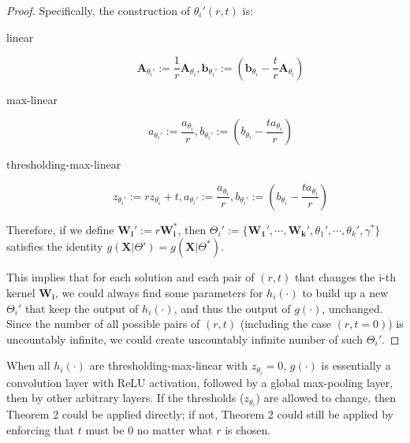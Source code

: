 \documentclass[12pt]{article}
\newcommand{\vect}[1]{\mathbf{#1}}
\newcommand{\matrixSymbol}[1]{\mathbf{#1}}
\begin{document}
\begin{proof}
Specifically, the construction of $\theta_i'(r, t)$ is:
\begin{description}
\item[linear] \begin{equation} \matrixSymbol{A}_{\theta_i'} := \frac{1}{r}\matrixSymbol{A}_{\theta_i}, \vect{b}_{\theta_i'} := (\vect{b}_{\theta_i} - \frac{t}{r}\matrixSymbol{A}_{\theta_i}) \end{equation}
\item[max-linear] \begin{equation} a_{\theta_i'} := \frac{a_{\theta_i}}{r}, b_{\theta_i'} := (b_{\theta_i} - \frac{ta_{\theta_i}}{r}) \end{equation}
\item[thresholding-max-linear] \begin{equation} z_{\theta_i'} := rz_{\theta_i}+t, a_{\theta_i'} := \frac{a_{\theta_i}}{r}, b_{\theta_i'} := (b_{\theta_i} - \frac{ta_{\theta_i}}{r}) \end{equation}
\end{description}

Therefore, if we define $\matrixSymbol{W_{i}'} := r\matrixSymbol{W_{i}^*}$, then $\Theta_i' := \{ \matrixSymbol{W_1'}, \cdots, \matrixSymbol{W_k'}, \theta_1', \cdots, \theta_k', \gamma^* \}$ satisfies the identity $g(\matrixSymbol{X}|\Theta') = g(\matrixSymbol{X}|\Theta^{*})$.

This implies that for each solution and each pair of $(r, t)$ that changes the i-th kernel $\matrixSymbol{W_i}$, we could always find some parameters for $h_i(\cdot)$ to build up a new $\Theta_i'$ that keep the output of $h_i(\cdot)$, and thus the output of $g(\cdot)$, unchanged. Since the number of all possible pairs of $(r, t)$ (including the case $(r, t=0)$) is uncountably infinite, we could create uncountably infinite number of such $\Theta_i'$.

\end{proof}

When all $h_i(\cdot)$ are thresholding-max-linear with $z_{\theta_i}=0$, $g(\cdot)$ is essentially a convolution layer with ReLU activation, followed by a global max-pooling layer, then by other arbitrary layers. If the thresholds ($z_{\theta_i}$) are allowed to change, then Theorem 2 could be applied directly; if not, Theorem 2 could still be applied by enforcing that $t$ must be 0 no matter what $r$ is chosen.
\end{document}
